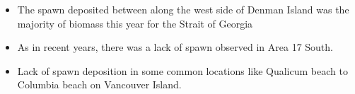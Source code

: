 \begin{itemize}
\item The spawn deposited between along the west side of Denman Island was the majority of biomass this year for the Strait of Georgia
\item As in recent years, there was a lack of spawn observed in Area 17 South.
\item  Lack of spawn deposition in some common locations like Qualicum beach to Columbia beach on Vancouver Island.
\end{itemize}